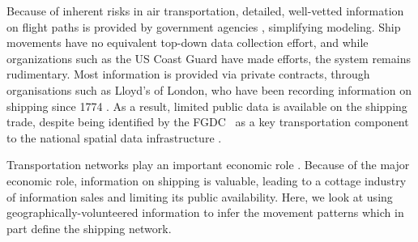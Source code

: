 \documentclass[12pt,letterpaper]{article}
\begin{document}
Because of inherent risks in air transportation, detailed, well-vetted information on flight paths is provided by government agencies \citep{guimera2005worldwide}, simplifying modeling. Ship movements have no equivalent top-down data collection effort, and while organizations such as the US Coast Guard have made efforts, the system remains rudimentary. Most information is provided via private contracts, through organisations such as Lloyd's of London, who have been recording information on shipping since 1774 \citep{Lloyd'sRegister-FairplayLtd.2010}. As a result, limited public data is available on the shipping trade, despite being identified by the FGDC~\citep{FGDC} as a key transportation component to the national spatial data infrastructure \citep{CurrierInPress}.

Transportation networks play an important economic role \citep{canning1993effects}. Because of the major economic role, information on shipping is valuable, leading to a cottage industry of information sales and limiting its public availability. Here, we look at using geographically-volunteered information to infer the movement patterns which in part define the shipping network.



\end{document}
